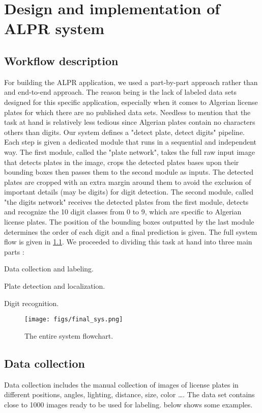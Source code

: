 \chapter{Design and implementation of ALPR system}\label{chapter:4}

\section{Workflow description}
For building the ALPR application, we used a part-by-part approach rather than and end-to-end approach. The reason being is the lack of labeled data sets designed for this specific application, especially when it comes to Algerian license plates for which there are no published data sets. Needless to mention that the task at hand is relatively less tedious since Algerian plates contain no characters others than digits. Our system defines a "detect plate, detect digits" pipeline. Each step is given a dedicated module that runs in a sequential and independent way. The first module,  called the "plate network", takes the full raw input image that detects plates in the image, crops the detected plates bases upon their bounding boxes then passes them to the second module as inputs. The detected plates are cropped with an extra margin around them to avoid the exclusion of important details (may be digits) for digit detection. The second module,  called "the digits network" receives the detected plates from the first module, detects and recognize the 10 digit classes from 0 to 9, which are specific to Algerian license plates. The position of the bounding boxes outputted by the last module determines the order of each digit and a final prediction is given. The full system flow is given
in \cref{fig:full_sys}. We proceeded to dividing this task at hand into three main parts :

\begin{compactitem}
	\item Data collection and labeling.
	\item Plate detection and localization.
	\item Digit recognition.
\end{compactitem}

\begin{figure}[!htpb]
	\centering
	\texttt{[image: figs/final\_sys.png]}
	\caption[The entire system flow]{The entire system flowchart.}
	\label{fig:full_sys}
\end{figure}

\section{Data collection}
Data collection includes the manual collection of images of license plates in different positions, angles, lighting, distance, size, color \ldots. The data set contains close to 1000 images ready to be used for labeling.  below shows some examples.

